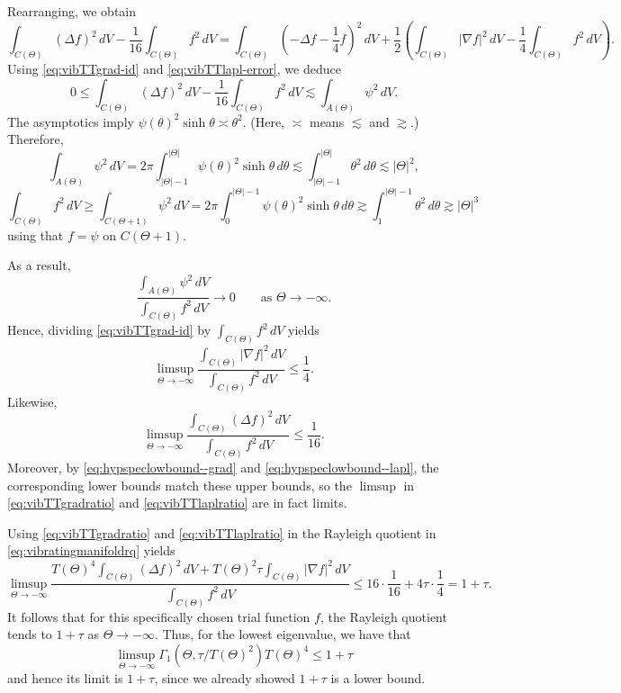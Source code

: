 \documentclass[11pt]{amsart}
\theoremstyle{definition}
\numberwithin{equation}{section}
\newcommand{\lapl}{\Delta}
\newcommand{\grad}{\nabla}
\begin{document}
Rearranging, we obtain
\[
\int_{C(\Theta)} (\lapl f)^2\,dV-\frac1{16}\int_{C(\Theta)} f^2\,dV
=
\int_{C(\Theta)}\left(-\lapl f-\frac14 f\right)^2\,dV
+\frac12\left(
\int_{C(\Theta)} |\grad f|^2\,dV-\frac14\int_{C(\Theta)} f^2\,dV
\right).
\]
Using \eqref{eq:vibTTgrad-id} and \eqref{eq:vibTTlapl-error}, we deduce
\[
0\le
\int_{C(\Theta)} (\lapl f)^2\,dV-\frac1{16}\int_{C(\Theta)} f^2\,dV
\lesssim
\int_{A(\Theta)} \psi^2\,dV.
\]
The asymptotics imply $\psi(\theta)^2\sinh\theta \asymp \theta^2$. (Here, $\asymp$ means $\lesssim$ and $\gtrsim$.) Therefore,
\[
\int_{A(\Theta)}\psi^2\,dV
=2\pi\int_{|\Theta|-1}^{|\Theta|}\psi(\theta)^2\sinh\theta\,d\theta
\lesssim \int_{|\Theta|-1}^{|\Theta|}\theta^2\,d\theta
\lesssim |\Theta|^2,
\]
\[
\int_{C(\Theta)}f^2\,dV
\ge \int_{C(\Theta+1)}\psi^2\,dV
=2\pi\int_{0}^{|\Theta|-1}\psi(\theta)^2\sinh\theta\,d\theta
\gtrsim \int_{1}^{|\Theta|-1}\theta^2\,d\theta
\gtrsim |\Theta|^3
\]
using that $f=\psi$ on $C(\Theta+1)$.

As a result,
\[
\frac{\int_{A(\Theta)} \psi^2\,dV}{\int_{C(\Theta)} f^2\,dV}\to 0
\qquad\text{as }\Theta\to-\infty.
\]
Hence, dividing \eqref{eq:vibTTgrad-id} by $\int_{C(\Theta)}f^2\,dV$ yields
\begin{equation}\label{eq:vibTTgradratio}
\limsup_{\Theta \to -\infty}\frac{\int_{C(\Theta)} |\grad f|^2 \, dV}{\int_{C(\Theta)} f^2 \,dV} \leq \frac14.
\end{equation}
Likewise,
\begin{equation}\label{eq:vibTTlaplratio}
\limsup_{\Theta \to -\infty}\frac{\int_{C(\Theta)} (\lapl f)^2 \, dV}{\int_{C(\Theta)} f^2 \,dV} \leq \frac{1}{16}.
\end{equation}
Moreover, by \eqref{eq:hypspeclowbound--grad} and \eqref{eq:hypspeclowbound--lapl}, the corresponding lower bounds match these upper bounds, so the $\limsup$ in \eqref{eq:vibTTgradratio} and \eqref{eq:vibTTlaplratio} are in fact limits.

Using \eqref{eq:vibTTgradratio} and \eqref{eq:vibTTlaplratio} in the Rayleigh quotient in \eqref{eq:vibratingmanifoldrq} yields
\[
\limsup_{\Theta \to -\infty} \frac{T(\Theta)^4\int_{C(\Theta)} (\lapl f)^2 \, dV + T(\Theta)^2\tau\int_{C(\Theta)} |\grad f|^2 \, dV}{\int_{C(\Theta)} f^2 \,dV} \leq 16\cdot\frac{1}{16}+4\tau\cdot\frac14=1+\tau.
\]
It follows that for this specifically chosen trial function $f$, the Rayleigh quotient tends to $1+\tau$ as $\Theta \to -\infty$. Thus, for the lowest eigenvalue, we have that
\[
\limsup_{\Theta \to -\infty} \Gamma_1(\Theta, \tau/T(\Theta)^2)T(\Theta)^4 \leq 1+\tau
\]
and hence its limit is $1 + \tau$, since we already showed $1 + \tau$ is a lower bound.
\end{document}
